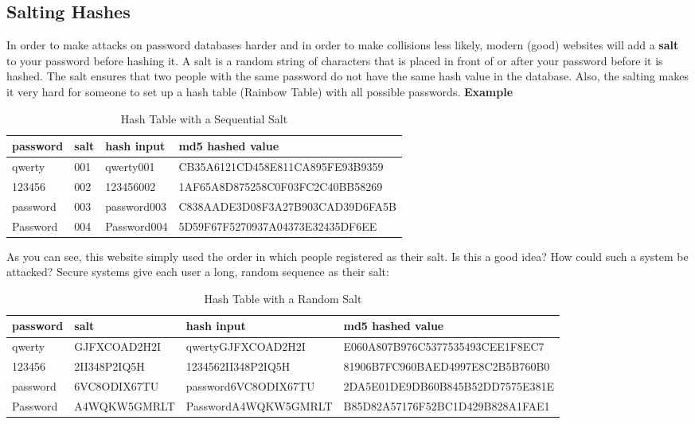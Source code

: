 \documentclass[11pt,a4paper]{report}
\begin{document}
\subsection{Salting Hashes}

In order to make attacks on password databases harder and in order to make collisions less likely, modern (good) websites will add a \textbf{salt} to your password before hashing it.
A salt is a random string of characters that is placed in front of or after your password before it is hashed.
The salt ensures that two people with the same password do not have the same hash value in the database.
Also, the salting makes it very hard for someone to set up a hash table (Rainbow Table) with all possible passwords.
\textbf{Example}
\begin{table}[h]
\centering
\begin{tabular}{|l|l|l|l|}
\hline
password & salt & hash input & md5 hashed value \\
\hline
qwerty & 001 & qwerty001 & CB35A6121CD458E811CA895FE93B9359 \\
123456 & 002 & 123456002 & 1AF65A8D875258C0F03FC2C40BB58269 \\
password & 003 & password003 & C838AADE3D08F3A27B903CAD39D6FA5B \\
Password & 004 & Password004 & 5D59F67F5270937A04373E32435DF6EE \\
\hline
\end{tabular}
\caption{Hash Table with a Sequential Salt}
\end{table}


As you can see, this website simply used the order in which people registered as their salt.
Is this a good idea? How could such a system be attacked?
Secure systems give each user a long, random sequence as their salt:

\begin{table}[h]
\scriptsize
\centering
\begin{tabular}{|l|l|l|l|}
\hline
password & salt & hash input & md5 hashed value \\
\hline
qwerty & GJFXCOAD2H2I & qwertyGJFXCOAD2H2I & E060A807B976C5377535493CEE1F8EC7 \\
123456 & 2II348P2IQ5H & 1234562II348P2IQ5H & 81906B7FC960BAED4997E8C2B5B760B0 \\
password & 6VC8ODIX67TU & password6VC8ODIX67TU & 2DA5E01DE9DB60B845B52DD7575E381E \\
Password & A4WQKW5GMRLT & PasswordA4WQKW5GMRLT & B85D82A57176F52BC1D429B828A1FAE1 \\
\hline
\end{tabular}
\caption{Hash Table with a Random Salt}
\end{table}
\end{document}
